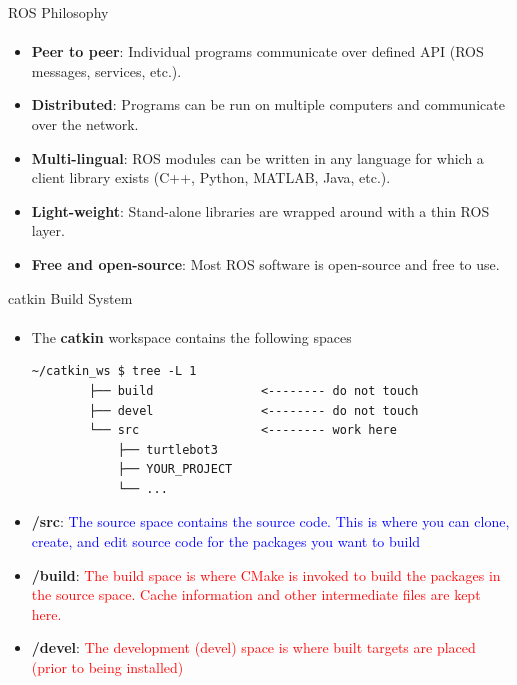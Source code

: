 \documentclass[aspectratio=169]{beamer}
\begin{document}
\begin{frame}{ROS Philosophy}
	\framesubtitle{}
	\begin{itemize}
		
		\item \textbf{Peer to peer}: Individual programs communicate over defined API (ROS messages, services, etc.).
		\item \textbf{Distributed}: Programs can be run on multiple computers and communicate over the network.
		\item \textbf{Multi-lingual}: ROS modules can be written in any language for which a client library exists (C++, Python, MATLAB, Java, etc.).
		\item \textbf{Light-weight}: Stand-alone libraries are wrapped around with a thin ROS layer.
		\item \textbf{Free and open-source}: Most ROS software is open-source and free to use.

	\end{itemize}
\end{frame}


\begin{frame}[fragile]{catkin Build System}
	\framesubtitle{ }
    \begin{itemize}
        \item The \textbf{catkin} workspace contains the following spaces

		\begin{lstlisting}[style=ascii-tree]
		~/catkin_ws $ tree -L 1
		├── build				<-------- do not touch
		├── devel				<-------- do not touch
		└── src					<-------- work here
			├── turtlebot3
			├── YOUR_PROJECT
			└── ...
		\end{lstlisting}

		\item \textbf{/src}: \textcolor{blue}{The source space contains the source code. This is where you can clone, create, and edit source code for the packages you want to build}
		\item \textbf{/build}: \textcolor{red}{The build space is where CMake is invoked to build the packages in the source space. Cache information and other intermediate files are kept here.}
		\item \textbf{/devel}: \textcolor{red}{The development (devel) space is where built targets are placed (prior to being installed)}
		\end{itemize}
\end{frame}
\end{document}
